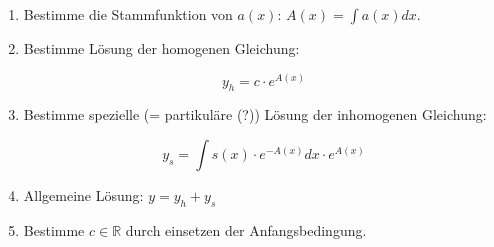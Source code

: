 \documentclass[a4paper, 16pt]{article}
\begin{document}
	\begin{enumerate}
		\item Bestimme die Stammfunktion von $a(x)$: $A(x) = \int a(x) dx$.

		\item Bestimme Lösung der homogenen Gleichung:

		\begin{equation*}
			y_h = c \cdot e^{A(x)}
		\end{equation*}

		\item Bestimme spezielle (= partikuläre (?)) Lösung der inhomogenen Gleichung:

		\begin{equation*}
			y_s = \int s(x) \cdot e^{-A(x)} dx \cdot e^{A(x)}
		\end{equation*}

		\item Allgemeine Lösung: $y = y_h + y_s$

		\item Bestimme $c \in \mathbb{R}$ durch einsetzen der Anfangsbedingung.
	\end{enumerate}
\end{document}
